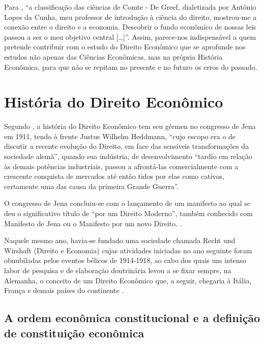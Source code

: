 \documentclass[
	10pt,				%
	openright,			%
	twoside,			%
	a5paper,			%
	english,			%
	french,				%
	spanish,			%
	brazil				%
	]{abntex2}
\renewenvironment{quote}
  {\small\list{}{\rightmargin=0.1cm \leftmargin=4cm}%
   \item\relax}
  {\endlist}
\begin{document}
Para , ``a classificação das ciências de
Comte - De Greef, dialetizada por Antônio Lopes da Cunha, meu professor
de introdução à ciência do direito, mostrou-me a conexão entre o direito
e a economia. Descobrir o fundo econômico de nossas leis passou a ser o
meu objetivo central {[}\ldots{}{]}''. Assim, parece-nos indispensável a
quem pretende contribuir com o estudo do Direito Econômico que se
aprofunde nos estudos não apenas das Ciências Econômicas, mas na própria
História Econômica, para que não se repitam no presente e no futuro os
erros do passado.

\section{História do Direito
Econômico}\label{sec:historia_direito_economico}

Segundo , a história do Direito Econômico
tem seu gérmen no congresso de Jena em 1911, tendo à frente Justus
Wilhelm Heddmann, ``cujo escopo era o de discutir a recente evolução do
Direito, em face das sensíveis transformações da sociedade alemã'',
quando sua indústria, de desenvolvimento ``tardio em relação às demais
potências industriais, passou a afrontá-las comercialmente com a
crescente conquista de mercados até então tidos por elas como cativos,
certamente uma das causa da primeira Grande Guerra''.

O congresso de Jena concluiu-se com o lançamento de um manifesto ao qual
se deu o significativo título de ``por um Direito Moderno'', também
conhecido com Manifesto de Jena ou o Manifesto por um novo Direito.
\cite[p.~20]{Nusdeo}.

\begin{quote}
Naquele mesmo ano, havia-se fundado uma sociedade chamada Recht und
Wirshaft (Direito e Economia) cujas atividades iniciadas no ano seguinte
foram obnubiladas pelos eventos bélicos de 1914-1918, ao cabo dos quais
um intenso labor de pesquisa e de elaboração doutrinária levou a se
fixar sempre, na Alemanha, o conceito de um Direito Econômico que, a
seguir, chegaria à Itália, França e demais países do continente
\cite[p.~20]{Nusdeo}.
\end{quote}

\subsection{A ordem econômica constitucional e a definição de
constituição
econômica}\label{a-ordem-econuxf4mica-constitucional-e-a-definiuxe7uxe3o-de-constituiuxe7uxe3o-econuxf4mica}
\end{document}
